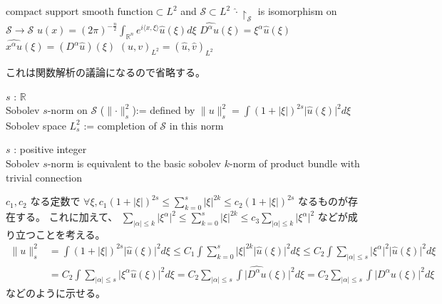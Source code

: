 \begin{Theorem}
\itemprop
  \Then \(\text{compact support smooth function} \subset L^2\) and \(\mathscr{S} \subset L^2\)
\itemprop
  \Then \(\hat{\cdot} \restriction_{\mathscr{S}}\) is isomorphism on \(\mathscr{S} \to \mathscr{S}\)
\itemprop
  \Then \(u(x) = (2 \pi)^{- \frac{n}{2}} \int_{\mathbb{R}^n} e^{i \langle x , \xi \rangle} \hat{u}(\xi) d \xi\)
\itemprop
  \Then \(\hat{D^\alpha u}(\xi) = \xi^\alpha \hat{u}(\xi)\) \\
  \Then \(\hat{x^\alpha u}(\xi) = (D^\alpha \hat{u})(\xi)\)
\itemprop
  \Then \((u,v)_{L^2} = (\hat{u} , \hat{v})_{L^2}\)
\end{Theorem}

\begin{Proof}
\itemprof
  これは関数解析の議論になるので省略する。
\end{Proof}

\begin{Definition}
\itemdefi
  \For \(s\) : \(\mathbb{R}\) \\
  \Define Sobolev \(s\)-norm on \(\mathscr{S}\) (\(\lVert \cdot \rVert^2_s\)):= defined by \(\lVert u \rVert^2_s = \int (1 + \lvert \xi \rvert)^{2s} \lvert \hat{u}(\xi) \rvert^2 d\xi\) \\
  \Define Sobolev space \(L^2_s\) := completion of \(\mathscr{S}\) in this norm
\end{Definition}

\begin{Theorem}
\itemprop
  \For \(s\) : positive integer \\
  \Then Sobolev \(s\)-norm is equivalent to the basic sobolev \(k\)-norm of product bundle with trivial connection
\end{Theorem}

\begin{Proof}
\itemprof
  \(c_1,c_2\) なる定数で \(\forall \xi , c_1 (1 + \lvert \xi \rvert)^{2s} \leq \sum_{k=0}^{s} \lvert \xi \rvert^{2k} \leq c_2 (1 + \lvert \xi \rvert)^{2s}\) なるものが存在する。
  これに加えて、 \(\sum_{\lvert \alpha \rvert \leq k} \lvert \xi^\alpha \rvert^2 \leq \sum_{k=0}^s \lvert \xi \rvert^{2k} \leq c_3 \sum_{\lvert \alpha \rvert \leq k} \lvert \xi^\alpha \rvert^2\) などが成り立つことを考える。
  \begin{align*}
    \lVert u \rVert_s^2
    &= \int (1 + \lvert \xi \rvert)^{2s} \lvert \hat{u}(\xi) \rvert^2 d \xi
    \leq C_1 \int \sum_{k=0}^{s} \lvert \xi \rvert^{2k} \lvert \hat{u}(\xi) \rvert^2 d \xi
    \leq C_2 \int \sum_{\lvert \alpha \rvert \leq s} \lvert \xi^\alpha \rvert^2 \lvert \hat{u}(\xi) \rvert^2 d \xi \\
    &= C_2 \int \sum_{\lvert \alpha \rvert \leq s} \lvert \xi^\alpha \hat{u}(\xi) \rvert^2 d \xi
    = C_2 \sum_{\lvert \alpha \rvert \leq s} \int \lvert \hat{D^\alpha u}(\xi) \rvert^2 d \xi
    = C_2 \sum_{\lvert \alpha \rvert \leq s} \int \lvert D^\alpha u(\xi) \rvert^2 d \xi
  \end{align*}
  などのように示せる。
\end{Proof}

